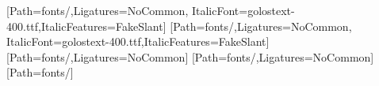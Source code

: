 
\usepackage[a5paper,left=12mm,right=12mm,top=12mm,bottom=6mm,includefoot,footskip=8mm]{geometry}
\usepackage{fontspec}
\usepackage{babel}
\usepackage{graphicx}
\usepackage{xcolor}
\usepackage{array}
\usepackage{longtable}
\usepackage{colortbl}
\usepackage{fancyhdr}
\usepackage{hyperref}

\makeatletter
\def\toclevel@section{0}
\def\toclevel@subsection{1}
\makeatother


\setmainfont{golostext-400.ttf}[Path=fonts/,Ligatures=NoCommon,
  ItalicFont=golostext-400.ttf,ItalicFeatures={FakeSlant}]
\newfontfamily{}[Path=fonts/,Ligatures=NoCommon,
  ItalicFont=golostext-400.ttf,ItalicFeatures={FakeSlant}]
\newfontfamily{}[Path=fonts/,Ligatures=NoCommon]
\newfontfamily{}[Path=fonts/,Ligatures=NoCommon]
\newfontfamily{}[Path=fonts/]


\pagestyle{fancy}
\fancyhf{}
\renewcommand{\headrulewidth}{0pt}
\renewcommand{\footrulewidth}{0pt}
\fancyfoot[C]{{\GolosText\fontsize{9}{11.2}\selectfont\thepage}}

\setlength{\parindent}{0pt}
\newlength{\ParagraphSpacing}
\setlength{\ParagraphSpacing}{7.5pt}
\setlength{\parskip}{\ParagraphSpacing}
\newcommand{\ParagraphStyle}{%
  \GolosText\fontsize{9}{12}\selectfont\raggedright
  \setlength{\parindent}{0pt}%
  \setlength{\parskip}{\ParagraphSpacing}}

\newlength{\SectionBeforeSpace}
\newlength{\SubsectionBeforeSpace}
\newlength{\SectionAfterSpace}
\newlength{\SubsectionAfterSpace}
\setlength{\SectionBeforeSpace}{12pt}
\setlength{\SubsectionBeforeSpace}{8.5pt}
\setlength{\SectionAfterSpace}{10.5pt}
\setlength{\SubsectionAfterSpace}{\ParagraphSpacing}

